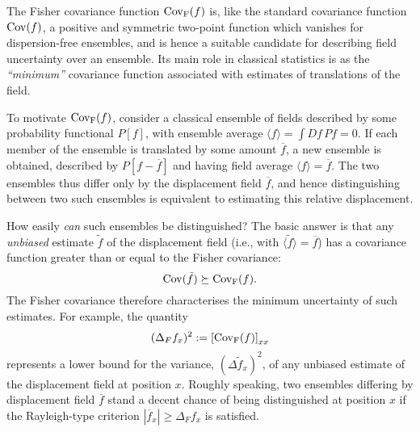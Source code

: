 \documentclass[a4paper,preprint, showpacs, aps, draft]{revtex4}
\begin{document}
{The Fisher covariance function ${\rm Cov_F}(f)$ is, like the standard
covariance function ${\rm Cov}(f)$, a positive and symmetric two-point 
function which vanishes for dispersion-free ensembles, and is hence a
suitable candidate for describing field uncertainty over an ensemble.
Its main role in classical statistics is as the {\it ``minimum''} covariance
function associated with estimates of translations of the field.

To motivate ${\rm Cov_F}(f)$, consider a classical ensemble of fields
described by some probability functional $P[f]$, with ensemble average $\langle
f\rangle = \int D\! f\,Pf = 0$.  If each member of the
ensemble is translated by some amount $\overline{f}$, a new ensemble is
obtained, described by $P[f-\overline{f}]$ and having field average
$\langle f\rangle = \overline{f}$.  The two ensembles thus
differ only by the displacement field $\overline{f}$, and hence
distinguishing between two such ensembles is equivalent to estimating
this relative displacement.

How easily {\it can} such ensembles be distinguished? 
The basic answer is that 
any {\it unbiased} estimate $\tilde{f}$ of the displacement 
field (i.e., with $\langle\tilde{f}\rangle =\overline{f}$) has a
covariance function greater than or equal to the Fisher covariance:
\begin{equation} \label{cramer}
{\rm Cov}({\tilde{f}}) \succeq {\rm Cov_F}(f) .
\end{equation}
The Fisher covariance therefore characterises the minimum uncertainty of such
estimates.  For example, the quantity 
\[
(\Delta_F f_x)^2 := \left[{\rm Cov_F}(f)\right]_{xx} \]
represents 
a lower bound for the variance, $(\Delta\tilde{f}_x)^2$, of any unbiased
estimate of the displacement field at position $x$.
Roughly speaking, two ensembles differing by displacement field
$\overline{f}$ stand a decent chance of being distinguished 
at position $x$ if the Rayleigh-type criterion
$|\overline{f}_x|\geq \Delta_F f_x$ is satisfied.

}
\end{document}
